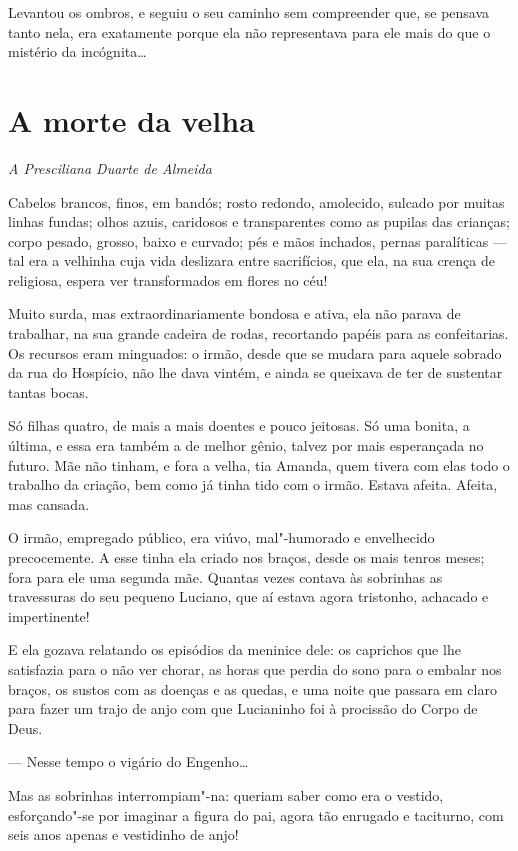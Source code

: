 Levantou os ombros, e seguiu o seu caminho sem compreender que, se
pensava tanto nela, era exatamente porque ela não representava para ele
mais do que o mistério da incógnita\ldots{}

\chapter{A morte da velha}

\hfill{}\emph{A Presciliana Duarte de Almeida}

\bigskip

Cabelos brancos, finos, em bandós; rosto redondo, amolecido, sulcado por
muitas linhas fundas; olhos azuis, caridosos e transparentes como as
pupilas das crianças; corpo pesado, grosso, baixo e curvado; pés e mãos
inchados, pernas paralíticas --- tal era a velhinha cuja vida deslizara
entre sacrifícios, que ela, na sua crença de religiosa, espera ver
transformados em flores no céu!

Muito surda, mas extraordinariamente bondosa e ativa, ela não parava de
trabalhar, na sua grande cadeira de rodas, recortando papéis para as
confeitarias. Os recursos eram minguados: o irmão, desde que se mudara
para aquele sobrado da rua do Hospício, não lhe dava vintém, e ainda se
queixava de ter de sustentar tantas bocas.

Só filhas quatro, de mais a mais doentes e pouco jeitosas. Só uma
bonita, a última, e essa era também a de melhor gênio, talvez por mais
esperançada no futuro. Mãe não tinham, e fora a velha, tia Amanda, quem
tivera com elas todo o trabalho da criação, bem como já tinha tido com o
irmão. Estava afeita. Afeita, mas cansada.

O irmão, empregado público, era viúvo, mal"-humorado e envelhecido
precocemente. A esse tinha ela criado nos braços, desde os mais tenros
meses; fora para ele uma segunda mãe. Quantas vezes contava às sobrinhas
as travessuras do seu pequeno Luciano, que aí estava agora tristonho,
achacado e impertinente!

E ela gozava relatando os episódios da meninice dele: os caprichos que
lhe satisfazia para o não ver chorar, as horas que perdia do sono para o
embalar nos braços, os sustos com as doenças e as quedas, e uma noite
que passara em claro para fazer um trajo de anjo com que Lucianinho foi
à procissão do Corpo de Deus.

--- Nesse tempo o vigário do Engenho\ldots{}

Mas as sobrinhas interrompiam"-na: queriam saber como era o vestido,
esforçando"-se por imaginar a figura do pai, agora tão enrugado e
taciturno, com seis anos apenas e vestidinho de anjo!


